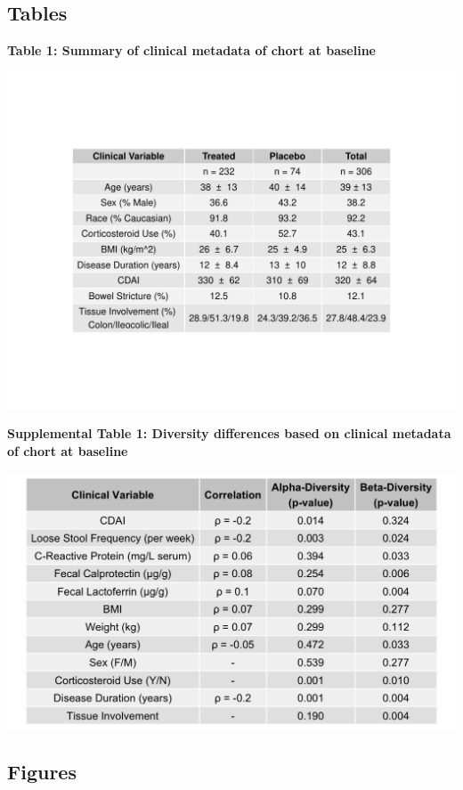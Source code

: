 \documentclass[11pt,]{article}
\begin{document}
\newpage

\subsection{Tables}\label{tables}

\textbf{Table 1: Summary of clinical metadata of chort at baseline}

\includegraphics{tables/Table1_baseline_metadata.pdf}

\newpage

\textbf{Supplemental Table 1: Diversity differences based on clinical
metadata of chort at baseline}

\includegraphics{tables/Supp.table1_cohortdiversity.png}

\newpage

\subsection{Figures}\label{figures}
\end{document}

